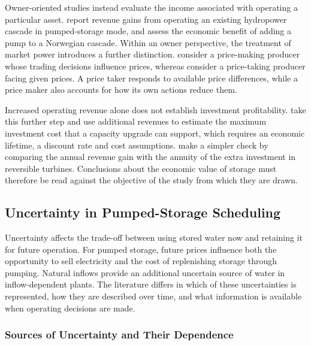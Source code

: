 Owner-oriented studies instead evaluate the income associated with
operating a particular asset. \citet{ak2019quantifying} report revenue
gains from operating an existing hydropower cascade in pumped-storage
mode, and \citet{alic2023optimal} assess the economic benefit of adding a
pump to a Norwegian cascade. Within an owner perspective, the treatment
of market power introduces a further distinction.
\citet{abgottspon2013stochastic} consider a price-making producer whose
trading decisions influence prices, whereas \citet{helseth2016} consider
a price-taking producer facing given prices. A price taker responds to
available price differences, while a price maker also accounts for how
its own actions reduce them.

Increased operating revenue alone does not establish investment
profitability. \citet{bore2026assessing} take this further step and use
additional revenues to estimate the maximum investment cost that a
capacity upgrade can support, which requires an economic lifetime, a
discount rate and cost assumptions. \citet{ak2019quantifying} make a
simpler check by comparing the annual revenue gain with the annuity of
the extra investment in reversible turbines. Conclusions about the
economic value of storage must therefore be read against the objective
of the study from which they are drawn.

\subsection{Uncertainty in Pumped-Storage Scheduling}
\label{sec:lit_uncertainty}

Uncertainty affects the trade-off between using stored water now and
retaining it for future operation. For pumped storage, future prices
influence both the opportunity to sell electricity and the cost of
replenishing storage through pumping. Natural inflows provide an
additional uncertain source of water in inflow-dependent plants. The
literature differs in which of these uncertainties is represented, how
they are described over time, and what information is available when
operating decisions are made.

\subsubsection{Sources of Uncertainty and Their Dependence}
\label{sec:lit_unc_sources}

